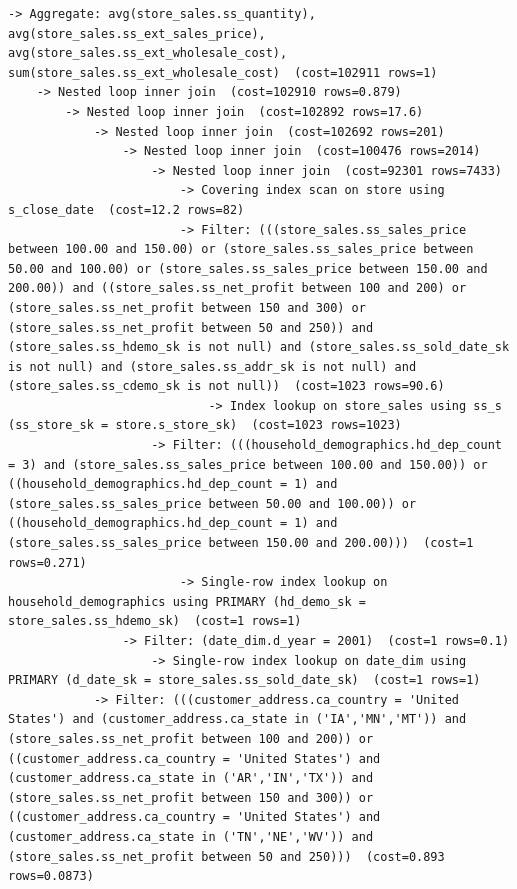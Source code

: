 \documentclass{ULBreport}
\begin{document}
\begin{lstlisting}[caption={Baseline \texttt{EXPLAIN FORMAT=TREE} on SF8 for Query 13}, label={lst:q13_explain_orig}, basicstyle=\ttfamily\scriptsize, breaklines=true, frame=single]
-> Aggregate: avg(store_sales.ss_quantity), avg(store_sales.ss_ext_sales_price), avg(store_sales.ss_ext_wholesale_cost), sum(store_sales.ss_ext_wholesale_cost)  (cost=102911 rows=1)
    -> Nested loop inner join  (cost=102910 rows=0.879)
        -> Nested loop inner join  (cost=102892 rows=17.6)
            -> Nested loop inner join  (cost=102692 rows=201)
                -> Nested loop inner join  (cost=100476 rows=2014)
                    -> Nested loop inner join  (cost=92301 rows=7433)
                        -> Covering index scan on store using s_close_date  (cost=12.2 rows=82)
                        -> Filter: (((store_sales.ss_sales_price between 100.00 and 150.00) or (store_sales.ss_sales_price between 50.00 and 100.00) or (store_sales.ss_sales_price between 150.00 and 200.00)) and ((store_sales.ss_net_profit between 100 and 200) or (store_sales.ss_net_profit between 150 and 300) or (store_sales.ss_net_profit between 50 and 250)) and (store_sales.ss_hdemo_sk is not null) and (store_sales.ss_sold_date_sk is not null) and (store_sales.ss_addr_sk is not null) and (store_sales.ss_cdemo_sk is not null))  (cost=1023 rows=90.6)
                            -> Index lookup on store_sales using ss_s (ss_store_sk = store.s_store_sk)  (cost=1023 rows=1023)
                    -> Filter: (((household_demographics.hd_dep_count = 3) and (store_sales.ss_sales_price between 100.00 and 150.00)) or ((household_demographics.hd_dep_count = 1) and (store_sales.ss_sales_price between 50.00 and 100.00)) or ((household_demographics.hd_dep_count = 1) and (store_sales.ss_sales_price between 150.00 and 200.00)))  (cost=1 rows=0.271)
                        -> Single-row index lookup on household_demographics using PRIMARY (hd_demo_sk = store_sales.ss_hdemo_sk)  (cost=1 rows=1)
                -> Filter: (date_dim.d_year = 2001)  (cost=1 rows=0.1)
                    -> Single-row index lookup on date_dim using PRIMARY (d_date_sk = store_sales.ss_sold_date_sk)  (cost=1 rows=1)
            -> Filter: (((customer_address.ca_country = 'United States') and (customer_address.ca_state in ('IA','MN','MT')) and (store_sales.ss_net_profit between 100 and 200)) or ((customer_address.ca_country = 'United States') and (customer_address.ca_state in ('AR','IN','TX')) and (store_sales.ss_net_profit between 150 and 300)) or ((customer_address.ca_country = 'United States') and (customer_address.ca_state in ('TN','NE','WV')) and (store_sales.ss_net_profit between 50 and 250)))  (cost=0.893 rows=0.0873)

\end{lstlisting}
\end{document}
